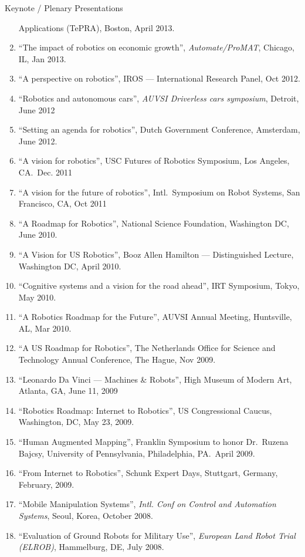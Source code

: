 \documentclass{article}
\begin{document}
\begin{cv}
\begin{cvlist}{Keynote / Plenary Presentations}
\begin{enumerate}
			      Applications (TePRA), Boston, April 2013.
			\item ``The impact of robotics on economic growth'', {\em Automate/ProMAT}, Chicago, IL, Jan 2013.
			\item ``A perspective on robotics'', IROS --- International Research  Panel, Oct 2012.
			\item ``Robotics and autonomous cars'', {\em AUVSI Driverless cars symposium}, Detroit, June 2012
			\item ``Setting an agenda for robotics'', Dutch Government  Conference, Amsterdam, June 2012.
			\item ``A vision for robotics'', USC Futures of Robotics Symposium, Los Angeles, CA.\  Dec. 2011
			\item ``A vision for the future of robotics'', Intl.\ Symposium on Robot Systems, San Francisco, CA, Oct 2011
			\item ``A Roadmap for Robotics'', National Science Foundation,  Washington DC, June 2010.
			\item ``A Vision for US Robotics'', Booz Allen Hamilton ---  Distinguished Lecture, Washington DC, April 2010.
			\item ``Cognitive systems and a vision for the road ahead'', IRT  Symposium, Tokyo, May 2010.
			\item ``A Robotics Roadmap for the Future'', AUVSI Annual Meeting, Huntsville, AL, Mar 2010.
			\item ``A US Roadmap for Robotics'', The Netherlands Office for Science and Technology Annual Conference, The Hague, Nov 2009.
			\item ``Leonardo Da Vinci --- Machines \& Robots'', High Museum of Modern Art, Atlanta, GA, June 11, 2009
			\item ``Robotics Roadmap: Internet to Robotics'', US Congressional Caucus, Washington, DC, May 23, 2009.
			\item ``Human Augmented Mapping'', Franklin Symposium to honor Dr.\ Ruzena Bajcsy, University of Pennsylvania, Philadelphia,
			      PA.\ April 2009.
			\item ``From Internet to Robotics'', Schunk Expert Days, Stuttgart, Germany, February, 2009.
			\item ``Mobile Manipulation Systems'', {\em Intl. Conf on Control
					      and Automation Systems}, Seoul, Korea, October 2008.
			\item ``Evaluation of Ground Robots for Military Use'', {\em
					      European Land Robot Trial (ELROB)}, Hammelburg, DE, July 2008.

\end{enumerate}
\end{cvlist}
\end{cv}
\end{document}
